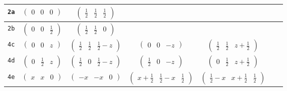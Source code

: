 \documentclass[fleqn,9pt,landscape]{jsarticle}
\begin{document}
\begin{center}
\begin{longtable}{ccccccc}
{\tt 2a} & $ \begin{pmatrix} 0 & 0 & 0 \end{pmatrix} $ & $ \begin{pmatrix} \frac{1}{2} & \frac{1}{2} & \frac{1}{2} \end{pmatrix} $ & $  $ & $  $ & $  $ & $  $ \\ \hline
{\tt 2b} & $ \begin{pmatrix} 0 & 0 & \frac{1}{2} \end{pmatrix} $ & $ \begin{pmatrix} \frac{1}{2} & \frac{1}{2} & 0 \end{pmatrix} $ & $  $ & $  $ & $  $ & $  $ \\ \hline
{\tt 4c} & $ \begin{pmatrix} 0 & 0 & z \end{pmatrix} $ & $ \begin{pmatrix} \frac{1}{2} & \frac{1}{2} & \frac{1}{2} - z \end{pmatrix} $ & $ \begin{pmatrix} 0 & 0 & - z \end{pmatrix} $ & $ \begin{pmatrix} \frac{1}{2} & \frac{1}{2} & z + \frac{1}{2} \end{pmatrix} $ & $  $ & $  $ \\ \hline
{\tt 4d} & $ \begin{pmatrix} 0 & \frac{1}{2} & z \end{pmatrix} $ & $ \begin{pmatrix} \frac{1}{2} & 0 & \frac{1}{2} - z \end{pmatrix} $ & $ \begin{pmatrix} \frac{1}{2} & 0 & - z \end{pmatrix} $ & $ \begin{pmatrix} 0 & \frac{1}{2} & z + \frac{1}{2} \end{pmatrix} $ & $  $ & $  $ \\ \hline
{\tt 4e} & $ \begin{pmatrix} x & x & 0 \end{pmatrix} $ & $ \begin{pmatrix} - x & - x & 0 \end{pmatrix} $ & $ \begin{pmatrix} x + \frac{1}{2} & \frac{1}{2} - x & \frac{1}{2} \end{pmatrix} $ & $ \begin{pmatrix} \frac{1}{2} - x & x + \frac{1}{2} & \frac{1}{2} \end{pmatrix} $ & $  $ & $  $ \\ \hline

\end{longtable}
\end{center}
\end{document}
